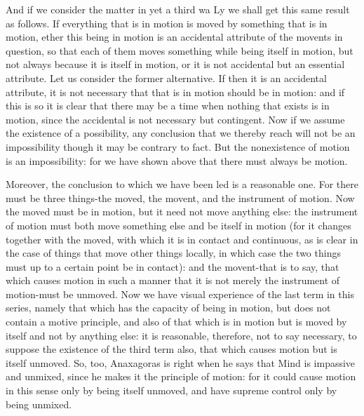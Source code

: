 And if we consider the matter in yet a third wa Ly we shall get this
same result as follows. If everything that is in motion is moved by
something that is in motion, ether this being in motion is an accidental
attribute of the movents in question, so that each of them moves something
while being itself in motion, but not always because it is itself
in motion, or it is not accidental but an essential attribute. Let
us consider the former alternative. If then it is an accidental attribute,
it is not necessary that that is in motion should be in motion: and
if this is so it is clear that there may be a time when nothing that
exists is in motion, since the accidental is not necessary but contingent.
Now if we assume the existence of a possibility, any conclusion that
we thereby reach will not be an impossibility though it may be contrary
to fact. But the nonexistence of motion is an impossibility: for we
have shown above that there must always be motion. 

Moreover, the conclusion to which we have been led is a reasonable
one. For there must be three things-the moved, the movent, and the
instrument of motion. Now the moved must be in motion, but it need
not move anything else: the instrument of motion must both move something
else and be itself in motion (for it changes together with the moved,
with which it is in contact and continuous, as is clear in the case
of things that move other things locally, in which case the two things
must up to a certain point be in contact): and the movent-that is
to say, that which causes motion in such a manner that it is not merely
the instrument of motion-must be unmoved. Now we have visual experience
of the last term in this series, namely that which has the capacity
of being in motion, but does not contain a motive principle, and also
of that which is in motion but is moved by itself and not by anything
else: it is reasonable, therefore, not to say necessary, to suppose
the existence of the third term also, that which causes motion but
is itself unmoved. So, too, Anaxagoras is right when he says that
Mind is impassive and unmixed, since he makes it the principle of
motion: for it could cause motion in this sense only by being itself
unmoved, and have supreme control only by being unmixed.

